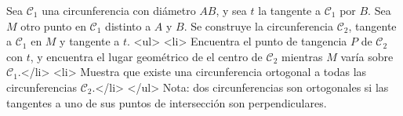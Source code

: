 Sea $\mathcal C_1$ una circunferencia con diámetro $AB$, y sea $t$ la tangente a $\mathcal C_1$ por $B$. Sea $M$ otro punto en $\mathcal C_1$ distinto a $A$ y $B$. Se construye la circunferencia $\mathcal C_2$, tangente a $\mathcal C_1$ en $M$ y tangente a $t$. 
<ul>
<li> Encuentra el punto de tangencia $P$ de $\mathcal C_2$ con $t$, y encuentra el lugar geométrico de el centro de $\mathcal C_2$ mientras $M$ varía sobre $\mathcal C_1$.</li>
<li> Muestra que existe una circunferencia ortogonal a todas las circunferencias $\mathcal C_2$.</li>
</ul>
Nota: dos circunferencias son ortogonales si las tangentes a uno de sus puntos de intersección son perpendiculares.
